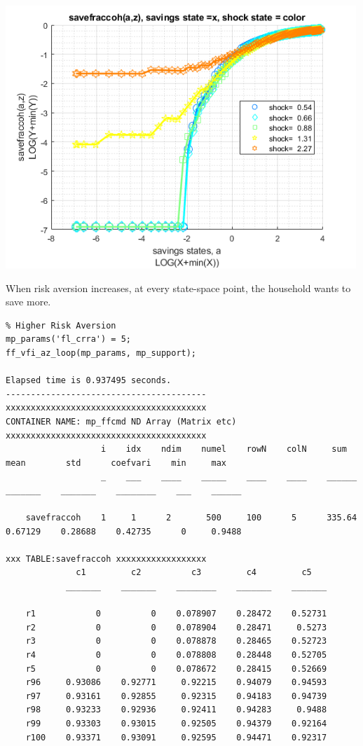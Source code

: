 \documentclass[
]{book}
\begin{document}
\includegraphics[width=5.20833in,height=\textheight]{img/fx_vfi_az_loop_images/figure_3.png}

When risk aversion increases, at every state-space point, the household
wants to save more.

\begin{verbatim}
% Higher Risk Aversion
mp_params('fl_crra') = 5;
ff_vfi_az_loop(mp_params, mp_support);

Elapsed time is 0.937495 seconds.
----------------------------------------
xxxxxxxxxxxxxxxxxxxxxxxxxxxxxxxxxxxxxxxx
CONTAINER NAME: mp_ffcmd ND Array (Matrix etc)
xxxxxxxxxxxxxxxxxxxxxxxxxxxxxxxxxxxxxxxx
                   i    idx    ndim    numel    rowN    colN     sum       mean        std      coefvari    min     max  
                   _    ___    ____    _____    ____    ____    ______    _______    _______    ________    ___    ______

    savefraccoh    1     1      2       500     100      5      335.64    0.67129    0.28688    0.42735      0     0.9488

xxx TABLE:savefraccoh xxxxxxxxxxxxxxxxxx
              c1         c2          c3         c4         c5   
            _______    _______    ________    _______    _______

    r1            0          0    0.078907    0.28472    0.52731
    r2            0          0    0.078904    0.28471     0.5273
    r3            0          0    0.078878    0.28465    0.52723
    r4            0          0    0.078808    0.28448    0.52705
    r5            0          0    0.078672    0.28415    0.52669
    r96     0.93086    0.92771     0.92215    0.94079    0.94593
    r97     0.93161    0.92855     0.92315    0.94183    0.94739
    r98     0.93233    0.92936     0.92411    0.94283     0.9488
    r99     0.93303    0.93015     0.92505    0.94379    0.92164
    r100    0.93371    0.93091     0.92595    0.94471    0.92317
\end{verbatim}
\end{document}
